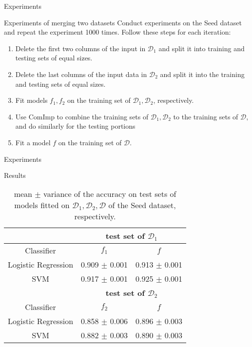 \documentclass[xcolor={dvipsnames}]{beamer} %
\begin{document}
\begin{frame}{Experiments}
    \begin{block}{Experiments of merging two datasets}
        Conduct experiments on the Seed dataset and repeat the experiment 1000 times. Follow these steps for each iteration:
        \begin{enumerate}
            \item Delete the first two columns of the input in $\mathcal{D}_1$ and split it into training and testing sets of equal sizes.
            \item Delete the last columns of the input data in $\mathcal{D}_2$ and split it into the training and testing sets of equal sizes.
            \item Fit models $f_1, f_2$ on the training set of $\mathcal{D}_1, \mathcal{D}_2$, respectively.
            \item Use ComImp to combine the training sets of $\mathcal{D}_1, \mathcal{D}_2$ to the training sets of $\mathcal{D}$, and do similarly for the testing portions
            \item Fit a model $f$ on the training set of $\mathcal{D}$.
        \end{enumerate}
    \end{block}
\end{frame}
\begin{frame}{Experiments}
    \begin{block}{Results}
        \begin{table}[htbp]
\caption{mean $\pm$ variance of the accuracy on test sets of  models fitted on $\mathcal{D}_1,\mathcal{D}_2,\mathcal{D}$ of the Seed dataset, respectively.}
\label{tab-merge2}
\begin{center}
\begin{tabular}{|c|c|c|}
\hline
\multicolumn{1}{|c|}{}& \multicolumn{2}{|c|}{\bf test set of $\mathcal{D}_1$}
\\ \hline 
\multicolumn{1}{|c|}{Classifier}& \multicolumn{1}{|c|}{\bf ${f}_1$}  &\multicolumn{1}{|c|}{\bf ${f}$}
\\ \hline 
Logistic Regression & 0.909 $\pm$ 0.001 &0.913 $\pm$ 0.001\\\hline
SVM & 0.917 $\pm$ 0.001 & 0.925 $\pm$ 0.001\\\hline
\hline
\multicolumn{1}{|c|}{}&\multicolumn{2}{|c|}{\bf test set of $\mathcal{D}_2$}
\\ \hline 
\multicolumn{1}{|c|}{Classifier}&\multicolumn{1}{|c|}{\bf ${f}_2$} &\multicolumn{1}{|c|}{\bf ${f}$}
\\ \hline 
Logistic Regression & 0.858 $\pm$ 0.006 & 0.896 $\pm$ 0.003\\\hline
SVM & 0.882 $\pm$ 0.003 & 0.890 $\pm$ 0.003\\\hline
\end{tabular}
\end{center}
\end{table}
    \end{block}
\end{frame}
\end{document}
